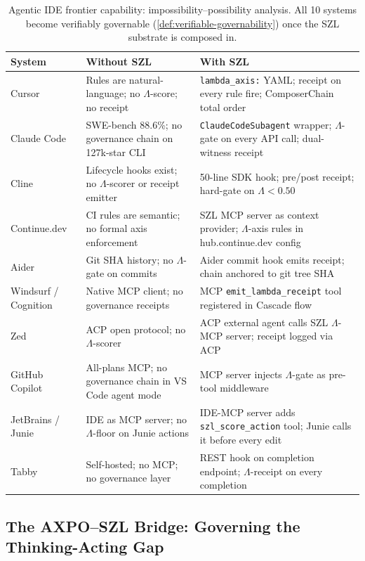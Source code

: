 \begin{table}[ht]
\centering
\small
\begin{tabular}{p{2.2cm}|p{4.5cm}|p{4.5cm}}
\textbf{System} & \textbf{Without SZL} & \textbf{With SZL} \\
\hline
Cursor & Rules are natural-language; no $\Lambda$-score; no receipt & \texttt{lambda\_axis:} YAML; receipt on every rule fire; ComposerChain total order \\
\hline
Claude Code & SWE-bench 88.6\%; no governance chain on 127k-star CLI & \texttt{ClaudeCodeSubagent} wrapper; $\Lambda$-gate on every API call; dual-witness receipt \\
\hline
Cline & Lifecycle hooks exist; no $\Lambda$-scorer or receipt emitter & 50-line SDK hook; pre/post receipt; hard-gate on $\Lambda < 0.50$ \\
\hline
Continue.dev & CI rules are semantic; no formal axis enforcement & SZL MCP server as context provider; $\Lambda$-axis rules in hub.continue.dev config \\
\hline
Aider & Git SHA history; no $\Lambda$-gate on commits & Aider commit hook emits receipt; chain anchored to git tree SHA \\
\hline
Windsurf / Cognition & Native MCP client; no governance receipts & MCP \texttt{emit\_lambda\_receipt} tool registered in Cascade flow \\
\hline
Zed & ACP open protocol; no $\Lambda$-scorer & ACP external agent calls SZL $\Lambda$-MCP server; receipt logged via ACP \\
\hline
GitHub Copilot & All-plans MCP; no governance chain in VS Code agent mode & MCP server injects $\Lambda$-gate as pre-tool middleware \\
\hline
JetBrains / Junie & IDE as MCP server; no $\Lambda$-floor on Junie actions & IDE-MCP server adds \texttt{szl\_score\_action} tool; Junie calls it before every edit \\
\hline
Tabby & Self-hosted; no MCP; no governance layer & REST hook on completion endpoint; $\Lambda$-receipt on every completion \\
\end{tabular}
\caption{Agentic IDE frontier capability: impossibility--possibility analysis.
  All 10 systems become verifiably governable (\cref{def:verifiable-governability})
  once the SZL substrate is composed in.}
\label{tab:agentic-frontier}
\end{table}

\subsection{The AXPO--SZL Bridge: Governing the Thinking-Acting Gap}
\label{ssec:axpo-szl-bridge}

